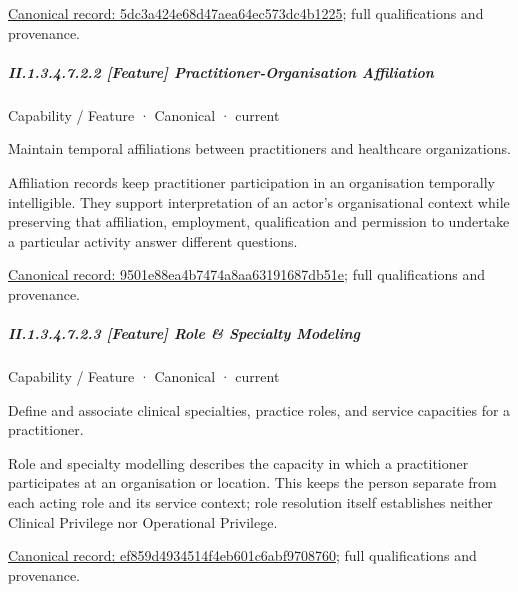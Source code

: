 {\footnotesize \href{../../../../../../../continuum/strategy/capability/feature/5dc3a424e68d47aea64ec573dc4b1225.md}{Canonical record: 5dc3a424e68d47aea64ec573dc4b1225}; full qualifications and provenance.}\par
\subparagraph*{II.1.3.4.7.2.2 [Feature] Practitioner-Organisation Affiliation}
\label{navigation:II.1.3.4.7.2.2}

\label{element:9501e88ea4b7474a8aa63191687db51e}
{\small Capability / Feature · Canonical · current}\par

Maintain temporal affiliations between practitioners and healthcare organizations.



Affiliation records keep practitioner participation in an organisation temporally intelligible. They support interpretation of an actor's organisational context while preserving that affiliation, employment, qualification and permission to undertake a particular activity answer different questions.


{\footnotesize \href{../../../../../../../continuum/strategy/capability/feature/9501e88ea4b7474a8aa63191687db51e.md}{Canonical record: 9501e88ea4b7474a8aa63191687db51e}; full qualifications and provenance.}\par
\subparagraph*{II.1.3.4.7.2.3 [Feature] Role \& Specialty Modeling}
\label{navigation:II.1.3.4.7.2.3}

\label{element:ef859d4934514f4eb601c6abf9708760}
{\small Capability / Feature · Canonical · current}\par

Define and associate clinical specialties, practice roles, and service capacities for a practitioner.



Role and specialty modelling describes the capacity in which a practitioner participates at an organisation or location. This keeps the person separate from each acting role and its service context; role resolution itself establishes neither Clinical Privilege nor Operational Privilege.


{\footnotesize \href{../../../../../../../continuum/strategy/capability/feature/ef859d4934514f4eb601c6abf9708760.md}{Canonical record: ef859d4934514f4eb601c6abf9708760}; full qualifications and provenance.}\par
